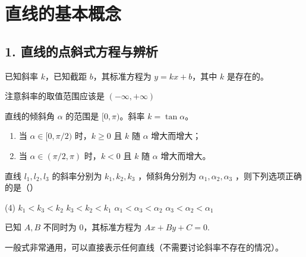 \section{直线的基本概念}

\subsection*{1. 直线的点斜式方程与辨析}

\begin{definition}[斜截式]
    已知斜率 $k$，已知截距 $b$，其标准方程为 $y=kx+b$，其中 $k$ 是存在的。

    \begin{tips}
        注意斜率的取值范围应该是 $(-\infty, +\infty)$
    \end{tips}
\end{definition}

\begin{theorem}[倾斜角与斜率的关系]
    直线的倾斜角 $\alpha$ 的范围是 $[0, \pi)$。斜率 $k = \tan\alpha$。
    \begin{enumerate}
        \item 当 $\alpha \in [0, \pi/2)$ 时，$k \ge 0$ 且 $k$ 随 $\alpha$ 增大而增大；
        \item 当 $\alpha \in (\pi/2, \pi)$ 时，$k < 0$ 且 $k$ 随 $\alpha$ 增大而增大。
    \end{enumerate}
\end{theorem}

\begin{example}
    直线 $l_1, l_2, l_3$ 的斜率分别为 $k_1, k_2, k_3$ ，倾斜角分别为 $\alpha_1, \alpha_2, \alpha_3$ ，则下列选项正确的是（\hspace{2em}）

    \begin{figure} [H]
        \centering
        \resizebox{0.15\textwidth}{!}{}
    \end{figure}

    \begin{tasks}(4)
        \task $k_1<k_3<k_2$
        \task $k_3<k_2<k_1$
        \task $\alpha_1<\alpha_3<\alpha_2$
        \task $\alpha_3<\alpha_2<\alpha_1$
    \end{tasks}
\end{example}

\begin{definition}[一般式]
    已知 $A, B$ 不同时为 $0$，其标准方程为 $Ax+By+C=0$.

    一般式非常通用，可以直接表示任何直线（不需要讨论斜率不存在的情况）。
\end{definition}

